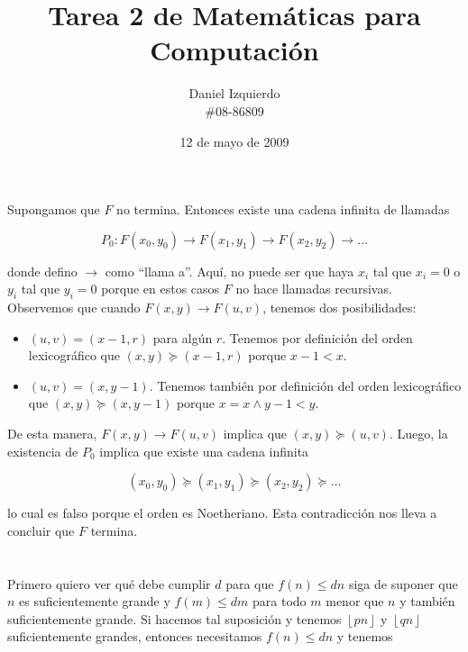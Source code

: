 \documentclass{article}
\newcommand{\piso}[1]{\left \lfloor #1 \right \rfloor}
\begin{document}

\title{Tarea 2 de Matemáticas para Computación}
\author{Daniel Izquierdo \\ \#08-86809}
\date{12 de mayo de 2009}

\maketitle

\section{}

Supongamos que $F$ no termina. Entonces existe una cadena
infinita de llamadas

$$
P_0: F(x_0, y_0) \rightarrow F(x_1, y_1) \rightarrow F(x_2, y_2) \rightarrow \ldots
$$

donde defino $\rightarrow$ como ``llama a''.
Aquí, no puede ser que haya $x_i$ tal que $x_i = 0$ o $y_i$ tal que $y_i = 0$
porque
en estos casos $F$ no hace llamadas recursivas.
Observemos que cuando
$F(x,y) \rightarrow F(u,v)$, tenemos dos posibilidades:

\begin{itemize}
\item $(u,v) = (x-1,r)$ para algún $r$. Tenemos por definición del orden
lexicográfico que $(x,y) \succeq (x-1,r)$ porque $x-1 < x$.
\item $(u,v) = (x,y-1)$. Tenemos también por definición del orden lexicográfico
que $(x,y) \succeq (x,y-1)$ porque $x = x \wedge y-1 < y$.
\end{itemize}

De esta manera, $F(x,y) \rightarrow F(u,v)$ implica que $(x,y) \succeq (u,v)$.
Luego, la existencia de $P_0$ implica que existe una cadena infinita

$$
(x_0, y_0) \succeq (x_1, y_1) \succeq (x_2, y_2) \succeq \ldots
$$

lo cual es falso porque el orden es Noetheriano. Esta contradicción nos lleva a
concluir que $F$ termina.

\section{}

Primero quiero ver qué debe cumplir $d$ para que $f(n) \leq dn$ siga de suponer
que $n$ es suficientemente grande y $f(m) \leq dm$ para todo $m$ menor que $n$
y también suficientemente grande. Si hacemos tal suposición y tenemos
$\piso{pn}$ y $\piso{qn}$ suficientemente grandes, entonces necesitamos
$f(n) \leq dn$ y tenemos
\end{document}
